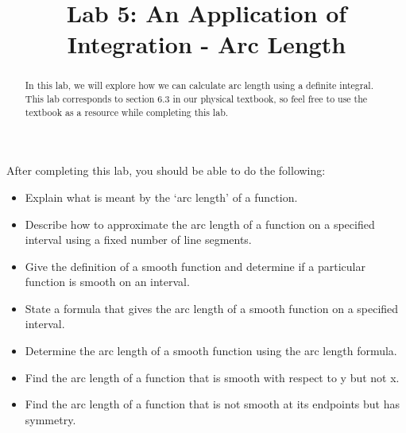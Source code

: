 \documentclass{ximera}
\title{Lab 5: An Application of Integration - Arc Length}
\begin{document}
\begin{abstract}
In this lab, we will explore how we can calculate arc length using a definite integral.  This lab corresponds to section 6.3 in our physical textbook, so feel free to use the textbook as a resource while completing this lab.\\
\end{abstract}

\maketitle

\begin{sectionOutcomes}

After completing this lab, you should be able to do the following: 

\begin{itemize}
\item Explain what is meant by the `arc length' of a function.
\item Describe how to approximate the arc length of a function on a specified interval using a fixed number of line segments.
\item Give the definition of a smooth function and determine if a particular function is smooth on an interval.
\item State a formula that gives the arc length of a smooth function on a specified interval. 
\item Determine the arc length of a smooth function using the arc length formula.
\item Find the arc length of a function that is smooth with respect to y but not x.
\item Find the arc length of a function that is not smooth at its endpoints but has symmetry. 
\end{itemize}

\end{sectionOutcomes}
\end{document}
